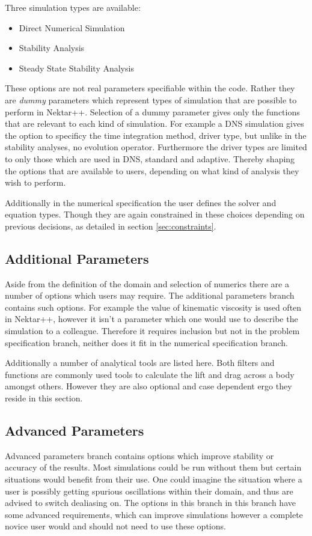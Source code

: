 \documentclass[11pt, a4paper]{report}
\begin{document}
Three simulation types are available:
\begin{itemize}
\item Direct Numerical Simulation
\item Stability Analysis
\item Steady State Stability Analysis
\end{itemize}

These options are not real parameters specifiable within the code. Rather they are \textit{dummy} parameters which represent types of simulation that are possible to perform in Nektar++. Selection of a dummy parameter gives only the functions that are relevant to each kind of simulation. For example a DNS simulation gives the option to specificy the time integration method, driver type, but unlike in the stability analyses, no evolution operator. Furthermore the driver types are limited to only those which are used in DNS, standard and adaptive. Thereby shaping the options that are available to users, depending on what kind of analysis they wish to perform.

Additionally in the numerical specification the user defines the solver and equation types. Though they are again constrained in these choices depending on previous decisions, as detailed in section \ref{sec:constraints}.

\subsection{Additional Parameters}
Aside from the definition of the domain and selection of numerics there are a number of options which users may require. The additional parameters branch contains such options. For example the value of kinematic viscosity is used often in Nektar++, however it isn't a parameter which one would use to describe the simulation to a colleague. Therefore it requires inclusion but not in the problem specification branch, neither does it fit in the numerical specification branch. 

Additionally a number of analytical tools are listed here. Both filters and functions are commonly used tools to calculate the lift and drag across a body amongst others. However they are also optional and case dependent ergo they reside in this section.

\subsection{Advanced Parameters}
Advanced parameters branch contains options which improve stability or accuracy of the results. Most simulations could be run without them but certain situations would benefit from their use. One could imagine the situation where a user is possibly getting spurious oscillations within their domain, and thus are advised to switch dealiasing on. The options in this branch in this branch have some advanced requirements, which can improve simulations however a complete novice user would and should not need to use these options.
\end{document}
